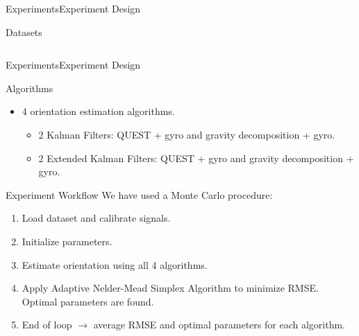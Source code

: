 \documentclass[10pt,aspectratio=1610]{beamer}
\begin{document}
\begin{frame}{Experiments}{Experiment Design}
\begin{block}{Datasets}
\begin{columns}
\begin{column}{.5\textwidth}
\end{column}
\end{columns}
\end{block}
\end{frame}


\begin{frame}{Experiments}{Experiment Design}
\begin{block}{Algorithms}
\begin{itemize}
	\item 4 orientation estimation algorithms.
	\begin{itemize}
		\item 2 Kalman Filters: QUEST + gyro and gravity decomposition + gyro.
		\item 2 Extended Kalman Filters:  QUEST + gyro and gravity decomposition + gyro.
	\end{itemize}
\end{itemize}
\end{block}
\begin{block}{Experiment Workflow}
We have used a Monte Carlo procedure:
\begin{enumerate}
	\item Load dataset and calibrate signals.
	\item Initialize parameters.
	\item Estimate orientation using all 4 algorithms.
	\item Apply Adaptive Nelder-Mead Simplex Algorithm to minimize RMSE. Optimal parameters are found.
	\item End of loop $\rightarrow$ average RMSE and optimal parameters for each algorithm.
\end{enumerate}
\end{block}
\end{frame}


\end{document}
